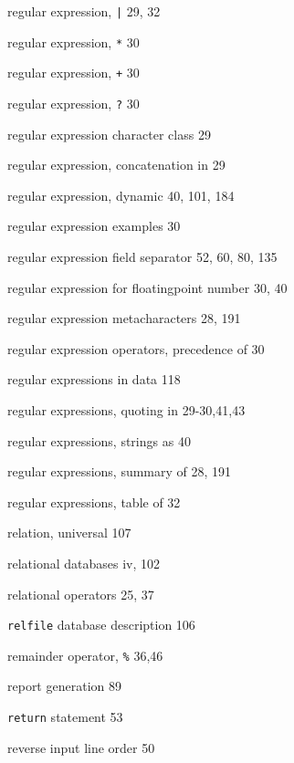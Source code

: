 \begin{multicols}{3}
\hangindent=3pc  regular expression, \verb'|' 29, 32

\hangindent=3pc  regular expression, \verb'*' 30

\hangindent=3pc  regular expression, \verb'+' 30

\hangindent=3pc  regular expression, \verb'?' 30

\hangindent=3pc  regular expression character class 29

\hangindent=3pc  regular expression, concatenation in 29

\hangindent=3pc  regular expression, dynamic 40, 101, 184

\hangindent=3pc  regular expression examples 30

\hangindent=3pc  regular expression field separator 52, 60, 80, 135

\hangindent=3pc  regular expression for floatingpoint number 30, 40



\hangindent=3pc  regular expression metacharacters 28, 191

\hangindent=3pc  regular expression operators, precedence of 30

\hangindent=3pc  regular expressions in data 118

\hangindent=3pc  regular expressions, quoting in 29-30,41,43

\hangindent=3pc  regular expressions, strings as 40

\hangindent=3pc  regular expressions, summary of 28, 191

\hangindent=3pc  regular expressions, table of 32

\hangindent=3pc  relation, universal 107

\hangindent=3pc  relational databases iv, 102

\hangindent=3pc  relational operators 25, 37

\hangindent=3pc  \verb'relfile' database description 106

\hangindent=3pc  remainder operator, \verb'%' 36,46

\hangindent=3pc  report generation 89

\hangindent=3pc  \verb'return' statement 53

\hangindent=3pc  reverse input line order 50


\end{multicols}
